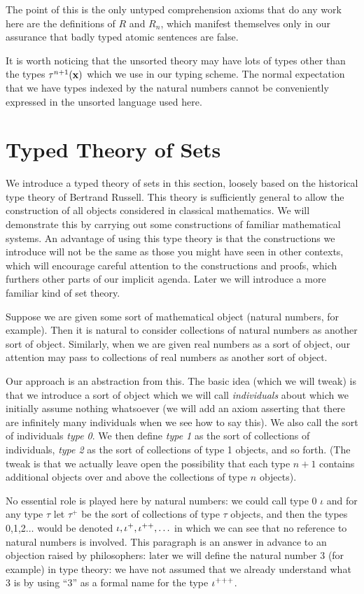 \documentclass[12pt]{book}
\begin{document}
The point of this is the only untyped comprehension axioms that do any work here are the definitions of $R$ and $R_n$, which manifest themselves only in our assurance that
badly typed atomic sentences are false.

It is worth noticing that the unsorted theory may have lots of types other than the types $\tau^{n+1}({\bf x})$ which we use in our typing scheme.  The normal expectation that we have types indexed by the natural numbers cannot be conveniently expressed in the unsorted language used here.

\section{Typed Theory of Sets}

We introduce a typed theory of sets in this section, loosely based on
the historical type theory of Bertrand Russell.  This theory is
sufficiently general to allow the construction of all objects
considered in classical mathematics.  We will demonstrate this by
carrying out some constructions of familiar mathematical systems.  An
advantage of using this type theory is that the constructions we
introduce will not be the same as those you might have seen in other
contexts, which will encourage careful attention to the constructions
and proofs, which furthers other parts of our implicit agenda.  Later
we will introduce a more familiar kind of set theory.

Suppose we are given some sort of mathematical object (natural
numbers, for example).  Then it is natural to consider collections of
natural numbers as another sort of object.  Similarly, when we are
given real numbers as a sort of object, our attention may pass to
collections of real numbers as another sort of object.

Our approach is an abstraction from this.  The basic idea (which we will tweak) is that we introduce a sort of
object which we will call {\em individuals\/} about which
we initially assume nothing whatsoever (we will add an axiom asserting
that there are infinitely many individuals when we see how to say
this).  We also call the sort of individuals {\em type 0\/}.  We then
define {\em type 1\/} as the sort of collections of individuals, {\em
type 2\/} as the sort of collections of type 1 objects, and so forth.
(The tweak is that we actually leave open the possibility that each type $n+1$ contains additional objects over and above the collections of type $n$ objects).

No essential role is played here by natural numbers: we could call
type 0 $\iota$ and for any type $\tau$ let $\tau^+$ be the sort of
collections of type $\tau$ objects, and then the types 0,1,2$\ldots$
would be denoted $\iota,\iota^+,\iota^{\bf ++},\ldots$ in which we can see
that no reference to natural numbers is involved.  This paragraph is
an answer in advance to an objection raised by philosophers: later we
will define the natural number 3 (for example) in type theory: we have
not assumed that we already understand what 3 is by using ``3'' as a
formal name for the type $\iota^{\bf +++}$.
\end{document}
